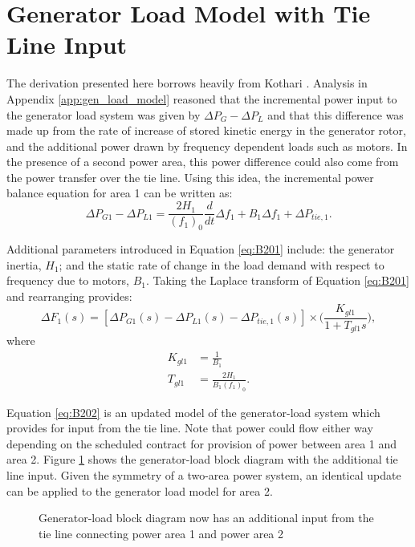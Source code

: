 \section{Generator Load Model with Tie Line Input}
The derivation presented here borrows heavily from Kothari \cite{Kothari2011}. Analysis in Appendix \ref{app:gen_load_model} reasoned that the incremental power input to the generator load system was given by $\Delta P_G - \Delta P_L$ and that this difference was made up from the rate of increase of stored kinetic energy in the generator rotor, and the additional power drawn by frequency dependent loads such as motors. In the presence of a second power area, this power difference could also come from the power transfer over the tie line. Using this idea, the incremental power balance equation for area 1 can be written as:
\begin{equation}
	\Delta P_{G1} - \Delta P_{L1} = \frac{2 H_1}{(f_1)_0} \frac{d}{dt} \Delta f_1 + B_1 \Delta f_1 + \Delta P_{tie, 1}. \label{eq:B201}
\end{equation}

Additional parameters introduced in Equation \ref{eq:B201} include: the generator inertia, $H_1$; and the static rate of change in the load demand with respect to frequency due to motors, $B_1$. Taking the Laplace transform of Equation \ref{eq:B201} and rearranging provides:
\begin{equation}
	\Delta F_1(s) = [\Delta P_{G1}(s) - \Delta P_{L1}(s) - \Delta P_{tie,1}(s)] \times \bigg( \frac{K_{gl1}}{1 + T_{gl1}s} \bigg), \label{eq:B202}
\end{equation}
where
\begin{align}
	K_{gl1} &= \frac{1}{B_1} \\
	T_{gl1} &= \frac{2H_1}{B_1 (f_1)_0}.
\end{align}

Equation \ref{eq:B202} is an updated model of the generator-load system which provides for input from the tie line. Note that power could flow either way depending on the scheduled contract for provision of power between area 1 and area 2. Figure \ref{fig:B201_generator_load_model_1_with_tie_line} shows the generator-load block diagram with the additional tie line input. Given the symmetry of a two-area power system, an identical update can be applied to the generator load model for area 2.

\begin{figure}[h]
	\centering
	
	\caption[Generator-load model for a two or more area power system]{Generator-load block diagram now has an additional input from the tie line connecting power area 1 and power area 2}
	\label{fig:B201_generator_load_model_1_with_tie_line}
\end{figure}

